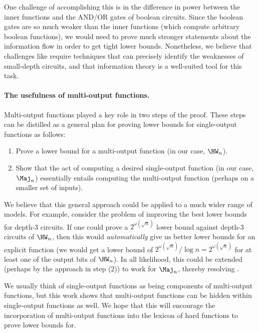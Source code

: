 One challenge of accomplishing this is in the difference in power between the inner functions and the AND/OR gates of boolean circuits. Since the boolean gates are so much weaker than the inner functions (which compute arbitrary boolean functions), we would need to prove much stronger statements about the information flow in order to get tight lower bounds. Nonetheless, we believe that challenges like  require techniques that can precisely identify the weaknesses of small-depth circuits, and that information theory is a well-suited tool for this task.



\paragraph*{The usefulness of multi-output functions.} 
Multi-output functions played a key role in two steps of the proof. These steps can be distilled as a general plan for proving lower bounds for single-output functions as follows:

\begin{enumerate}[(1)]
    \item Prove a lower bound for a multi-output function (in our case, $\HW_n$). 
    \item Show that the act of computing a desired single-output function (in our case, $\Maj_n$) essentially entails computing the multi-output function (perhaps on a smaller set of inputs).
\end{enumerate}

We believe that this general approach could be applied to a much wider range of models. For example, consider the problem of improving the best lower bounds for depth-3 circuits. If one could prove a $2^{\omega(\sqrt{n})}$ lower bound against depth-3 circuits of $\HW_n$, then this would \emph{automatically} give us better lower bounds for an explicit function (we would get a lower bound of $2^{\omega(\sqrt{n})}/\log n = 2^{\omega(\sqrt{n})}$ for at least one of the output bits of $\HW_n$). In all likelihood, this could be extended (perhaps by the approach in step (2)) to work for $\Maj_n$, thereby resolving . 

We usually think of single-output functions as being components of multi-output functions, but this work shows that multi-output functions can be hidden within single-output functions as well. We hope that this will encourage the incorporation of multi-output functions into the lexicon of hard functions to prove lower bounds for. 



